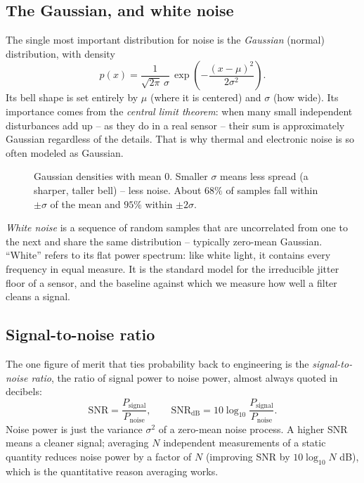 \subsection{The Gaussian, and white noise}

The single most important distribution for noise is the \emph{Gaussian} (normal) distribution,
with density
\[
  p(x) = \frac{1}{\sqrt{2\pi}\,\sigma}\,\exp\!\left(-\frac{(x-\mu)^2}{2\sigma^2}\right).
\]
Its bell shape is set entirely by $\mu$ (where it is centered) and $\sigma$ (how wide). Its
importance comes from the \emph{central limit theorem}: when many small independent disturbances
add up -- as they do in a real sensor -- their sum is approximately Gaussian regardless of the
details. That is why thermal and electronic noise is so often modeled as Gaussian.

\begin{figure}[H]
\centering
{}
\caption{Gaussian densities with mean $0$. Smaller $\sigma$ means less spread (a sharper, taller
bell) -- less noise. About $68\%$ of samples fall within $\pm\sigma$ of the mean and $95\%$
within $\pm 2\sigma$.}
\label{ch42:fig-gaussian}
\end{figure}

\emph{White noise} is a sequence of random samples that are uncorrelated from one to the next and
share the same distribution -- typically zero-mean Gaussian. ``White'' refers to its flat power
spectrum: like white light, it contains every frequency in equal measure. It is the standard
model for the irreducible jitter floor of a sensor, and the baseline against which we measure how
well a filter cleans a signal.

\subsection{Signal-to-noise ratio}

The one figure of merit that ties probability back to engineering is the \emph{signal-to-noise
ratio}, the ratio of signal power to noise power, almost always quoted in decibels:
\[
  \mathrm{SNR} = \frac{P_{\text{signal}}}{P_{\text{noise}}}, \qquad
  \mathrm{SNR}_{\text{dB}} = 10\log_{10}\!\frac{P_{\text{signal}}}{P_{\text{noise}}}.
\]
Noise power is just the variance $\sigma^2$ of a zero-mean noise process. A higher SNR means a
cleaner signal; averaging $N$ independent measurements of a static quantity reduces noise power
by a factor of $N$ (improving SNR by $10\log_{10} N$ dB), which is the quantitative reason
averaging works.

